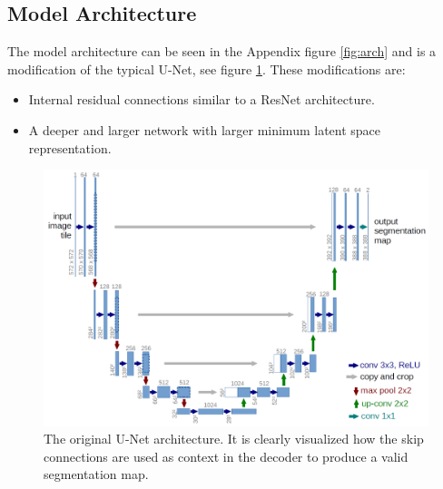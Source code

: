 \documentclass[fleqn,10pt]{SelfArx} %
\begin{document}
\subsection{Model Architecture}
The model architecture can be seen in the Appendix figure \ref{fig:arch} and is a modification of the typical U-Net, see figure \ref{fig:unet}. These modifications are:
\begin{itemize}
  \setlength{\itemsep}{0pt}
  \setlength{\parskip}{0pt}
    \item Internal residual connections similar to a ResNet architecture.
    \item A deeper and larger network with larger minimum latent space representation.
\end{itemize}
\begin{figure}[h]
    \centering
    \includegraphics[width=\linewidth]{report/Images/u-net-architecture.png}
    \caption{The original U-Net architecture. It is clearly visualized how the skip connections are used as context in the decoder to produce a valid segmentation map.\cite{Unet}}
    \label{fig:unet}
\end{figure}
\end{document}
